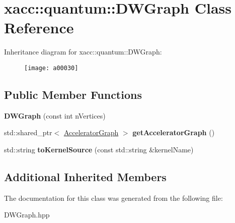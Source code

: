 \hypertarget{a00030}{}\section{xacc\+:\+:quantum\+:\+:D\+W\+Graph Class Reference}
\label{a00030}
Inheritance diagram for xacc\+:\+:quantum\+:\+:D\+W\+Graph\+:\begin{figure}[H]
\begin{center}
\leavevmode
\texttt{[image: a00030]}
\end{center}
\end{figure}
\subsection*{Public Member Functions}
\begin{DoxyCompactItemize}
\item 
{\bfseries D\+W\+Graph} (const int n\+Vertices)\hypertarget{a00030_adc891c7ec39fbb480d9102c3b0458e4c}{}\label{a00030_adc891c7ec39fbb480d9102c3b0458e4c}

\item 
std\+::shared\+\_\+ptr$<$ \hyperlink{a00044}{Accelerator\+Graph} $>$ {\bfseries get\+Accelerator\+Graph} ()\hypertarget{a00030_acdce3a79dfc4e296c215ac95f6fef8f5}{}\label{a00030_acdce3a79dfc4e296c215ac95f6fef8f5}

\item 
std\+::string {\bfseries to\+Kernel\+Source} (const std\+::string \&kernel\+Name)\hypertarget{a00030_a636bf17193ae20ae6355755dacafdf98}{}\label{a00030_a636bf17193ae20ae6355755dacafdf98}

\end{DoxyCompactItemize}
\subsection*{Additional Inherited Members}


The documentation for this class was generated from the following file\+:\begin{DoxyCompactItemize}
\item 
D\+W\+Graph.\+hpp\end{DoxyCompactItemize}
